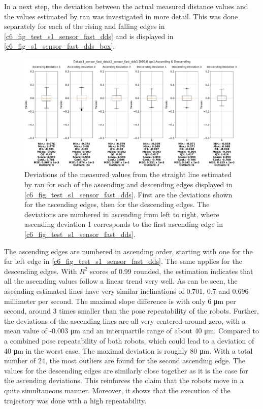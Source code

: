 In a next step, the deviation between the actual measured distance values and the values estimated by \gls{ran} was investigated in more detail. This was done separately for each of the rising and falling edges in \autoref{c6_fig_test_s1_sensor_fast_dds} and is displayed in \autoref{c6_fig_s1_sensor_fast_dds_box}.
\begin{figure}[H]
	\centering
	\includegraphics[width=1\textwidth]{Figures/c6/s1/s1_sensor_fast_dds_1_box_aio.pdf}
	\caption{Deviations of the measured values from the straight line estimated by \gls{ran} for each of the ascending and descending edges displayed in \autoref{c6_fig_test_s1_sensor_fast_dds}. First are the deviations shown for the ascending edges, then for the descending edges. The deviations are numbered in ascending from left to right, where ascending deviation 1 corresponds to the first ascending edge in \autoref{c6_fig_test_s1_sensor_fast_dds}.}
	\label{c6_fig_s1_sensor_fast_dds_box}
\end{figure}
The ascending edges are numbered in ascending order, starting with one for the far left edge in \autoref{c6_fig_test_s1_sensor_fast_dds}. The same applies for the descending edges. With $R^2$ scores of 0.99 rounded, the estimation indicates that all the ascending values follow a linear trend very well. As can be seen, the ascending estimated lines have very similar inclinations of 0.701, 0.7 and 0.696 millimeter per second. The maximal slope difference is with only 6 \si{\micro\meter} per second, around 3 times smaller than the pose repeatability of the robots. Further, the deviations of the ascending lines are all very centered around zero, with a mean value of -0.003 \si{\micro\meter} and an interquartile range of about 40 \si{\micro\meter}. Compared to a combined pose repeatability of both robots, which could lead to a deviation of 40 \si{\micro\meter} in the worst case. The maximal deviation is roughly 80 \si{\micro\meter}. With a total number of 24, the most outliers are found for the second ascending edge. The values for the descending edges are similarly close together as it is the case for the ascending deviations. This reinforces the claim that the robots move in a quite simultaneous manner. Moreover, it shows that the execution of the trajectory was done with a high repeatability.


